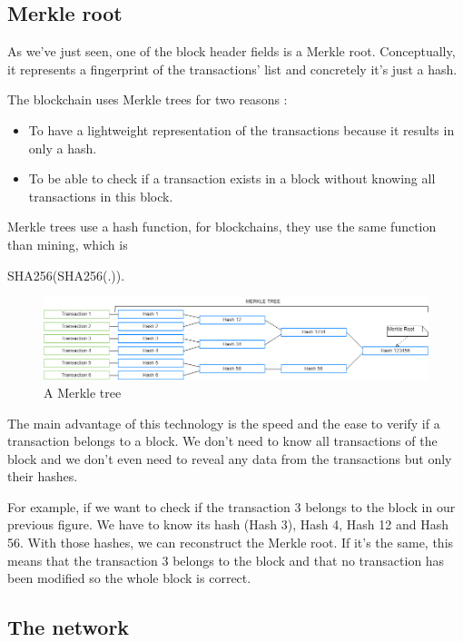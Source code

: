   \subsection{Merkle root} \label{merkleRoot}

  As we've just seen, one of the block header fields is a Merkle root. Conceptually, it represents a fingerprint of the transactions' list and concretely it's just a hash.

  The blockchain uses Merkle trees for two reasons :

  \begin{itemize}
    \item To have a lightweight representation of the transactions because it results in only a hash.
    \item To be able to check if a transaction exists in a block without knowing all transactions in this block.
  \end{itemize}

  Merkle trees use a hash function, for blockchains, they use the same function than mining, which is

  SHA256(SHA256(.)).

  \begin{figure}[h]
  \centering
  \includegraphics[width=\textwidth]{Figures/merkleTree}
  \caption{A Merkle tree}
  \end{figure}
  \medskip

  The main advantage of this technology is the speed and the ease to verify if a transaction belongs to a block. We don't need to know all transactions of the block and we don't even need to reveal any data from the transactions but only their hashes. \newline

  For example, if we want to check if the transaction 3 belongs to the block in our previous figure. We have to know its hash (Hash 3), Hash 4, Hash 12 and Hash 56. With those hashes, we can reconstruct the Merkle root. If it's the same, this means that the transaction 3 belongs to the block and that no transaction has been modified so the whole block is correct.

  \subsection{The network}

